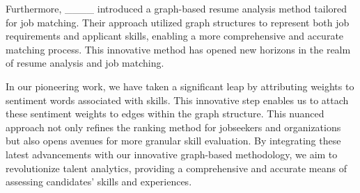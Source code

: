 Furthermore, ____ introduced a graph-based resume analysis method tailored for job matching. Their approach utilized graph structures to represent both job requirements and applicant skills, enabling a more comprehensive and accurate matching process. This innovative method has opened new horizons in the realm of resume analysis and job matching.

In our pioneering work, we have taken a significant leap by attributing weights to sentiment words associated with skills. This innovative step enables us to attach these sentiment weights to edges within the graph structure. This nuanced approach not only refines the ranking method for jobseekers and organizations but also opens avenues for more granular skill evaluation. By integrating these latest advancements with our innovative graph-based methodology, we aim to revolutionize talent analytics, providing a comprehensive and accurate means of assessing candidates' skills and experiences.
